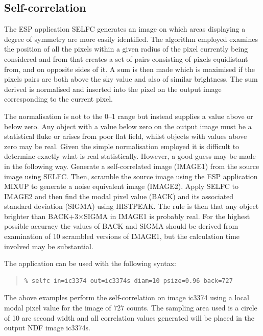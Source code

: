 \documentclass[twoside,11pt]{article}
\newenvironment{myquote}{\begin{quote}\begin{small}}{\end{small}\end{quote}}
\begin{document}
\subsection{Self-correlation}

The ESP application SELFC generates an image on which areas 
displaying a degree of symmetry are more easily identified. The algorithm 
employed examines the position of all the pixels within a given radius of 
the pixel currently being considered and from that creates a set of pairs 
consisting of pixels equidistant from, and on opposite sides of it. A 
sum is then made which is maximised if the pixels pairs are both above 
the sky value and also of similar brightness. The sum derived is 
normalised and inserted into the pixel on the output image corresponding 
to the current pixel. 

The normalisation is not to the 0--1 range but instead supplies a value above 
or below zero. Any object with a value below zero on the output image 
must be a statistical fluke or arises from poor flat field, whilst
objects with values above zero may be real. Given the simple normalisation 
employed it is difficult to determine exactly what is real statistically. 
However, a good guess may be made in the following way. Generate a 
self-correlated image (IMAGE1) from the source image using SELFC. Then, 
scramble the source image using the ESP application MIXUP to generate 
a noise equivalent image (IMAGE2). Apply SELFC to IMAGE2 and then find 
the modal pixel value (BACK) and its associated standard deviation (SIGMA) using 
HISTPEAK. The rule is then that any object brighter than BACK$+$3$\times$SIGMA 
in IMAGE1 is probably real. For the highest possible accuracy the values 
of BACK and SIGMA should be derived from examination of 10 scrambled versions 
of IMAGE1, but the calculation time involved may be substantial. 

The application can be used with the following syntax:

\begin{myquote}
\begin{verbatim}
% selfc in=ic3374 out=ic3374s diam=10 psize=0.96 back=727
\end{verbatim}
\end{myquote}

The above examples perform the self-correlation on image ic3374 using a local
modal pixel value for the image of 727 counts. The sampling area used is 
a circle of 10 arc second width and all correlation values generated 
will be placed in the output NDF image ic3374s.
\end{document}
